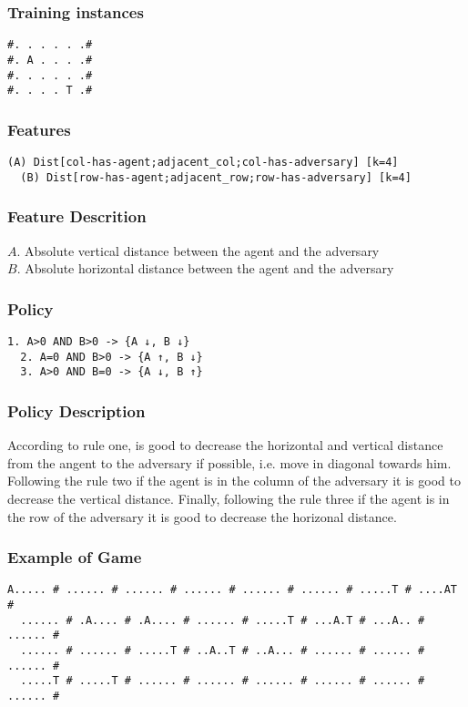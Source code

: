 \documentclass[a4paper]{article}
\begin{document}
\subsubsection{Training instances}
\begin{Verbatim}[fontsize=\footnotesize]
#. . . . . .#
#. A . . . .#
#. . . . . .#
#. . . . T .#
\end{Verbatim}

\subsubsection{Features}
\begin{Verbatim}[fontsize=\footnotesize]
  (A) Dist[col-has-agent;adjacent_col;col-has-adversary] [k=4]
  (B) Dist[row-has-agent;adjacent_row;row-has-adversary] [k=4]
\end{Verbatim}

\subsubsection{Feature Descrition}
$A$. Absolute vertical distance between the agent and the adversary\\
$B$. Absolute horizontal distance between the agent and the adversary
\subsubsection{Policy}

\begin{Verbatim}[fontsize=\footnotesize]
  1. A>0 AND B>0 -> {A ↓, B ↓}
  2. A=0 AND B>0 -> {A ↑, B ↓}
  3. A>0 AND B=0 -> {A ↓, B ↑}
\end{Verbatim}

\subsubsection{Policy Description}
According to rule one, is good to decrease the horizontal and vertical distance from the angent to the adversary if possible, i.e. move in diagonal towards him. Following the rule two if the agent is in the column of the adversary it is good to decrease the vertical distance. Finally, following the rule three if the agent is in the row of the adversary it is good to decrease the horizonal distance.

\subsubsection{Example of Game}
\begin{Verbatim}[fontsize=\footnotesize]
  A..... # ...... # ...... # ...... # ...... # ...... # .....T # ....AT #
  ...... # .A.... # .A.... # ...... # .....T # ...A.T # ...A.. # ...... #
  ...... # ...... # .....T # ..A..T # ..A... # ...... # ...... # ...... #
  .....T # .....T # ...... # ...... # ...... # ...... # ...... # ...... #
\end{Verbatim}
\end{document}

